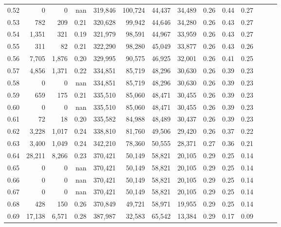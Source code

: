 \begin{tabular}{rrrrrrrrrrrrrr}
0.52 &       0 &      0 &   nan &  319,846 &  100,724 &  44,437 &  34,489 &  0.26 &  0.44 &      0.27 \\
0.53 &     782 &    209 &  0.21 &  320,628 &   99,942 &  44,646 &  34,280 &  0.26 &  0.43 &      0.27 \\
0.54 &   1,351 &    321 &  0.19 &  321,979 &   98,591 &  44,967 &  33,959 &  0.26 &  0.43 &      0.27 \\
0.55 &     311 &     82 &  0.21 &  322,290 &   98,280 &  45,049 &  33,877 &  0.26 &  0.43 &      0.26 \\
0.56 &   7,705 &  1,876 &  0.20 &  329,995 &   90,575 &  46,925 &  32,001 &  0.26 &  0.41 &      0.25 \\
0.57 &   4,856 &  1,371 &  0.22 &  334,851 &   85,719 &  48,296 &  30,630 &  0.26 &  0.39 &      0.23 \\
0.58 &       0 &      0 &   nan &  334,851 &   85,719 &  48,296 &  30,630 &  0.26 &  0.39 &      0.23 \\
0.59 &     659 &    175 &  0.21 &  335,510 &   85,060 &  48,471 &  30,455 &  0.26 &  0.39 &      0.23 \\
0.60 &       0 &      0 &   nan &  335,510 &   85,060 &  48,471 &  30,455 &  0.26 &  0.39 &      0.23 \\
0.61 &      72 &     18 &  0.20 &  335,582 &   84,988 &  48,489 &  30,437 &  0.26 &  0.39 &      0.23 \\
0.62 &   3,228 &  1,017 &  0.24 &  338,810 &   81,760 &  49,506 &  29,420 &  0.26 &  0.37 &      0.22 \\
0.63 &   3,400 &  1,049 &  0.24 &  342,210 &   78,360 &  50,555 &  28,371 &  0.27 &  0.36 &      0.21 \\
0.64 &  28,211 &  8,266 &  0.23 &  370,421 &   50,149 &  58,821 &  20,105 &  0.29 &  0.25 &      0.14 \\
0.65 &       0 &      0 &   nan &  370,421 &   50,149 &  58,821 &  20,105 &  0.29 &  0.25 &      0.14 \\
0.66 &       0 &      0 &   nan &  370,421 &   50,149 &  58,821 &  20,105 &  0.29 &  0.25 &      0.14 \\
0.67 &       0 &      0 &   nan &  370,421 &   50,149 &  58,821 &  20,105 &  0.29 &  0.25 &      0.14 \\
0.68 &     428 &    150 &  0.26 &  370,849 &   49,721 &  58,971 &  19,955 &  0.29 &  0.25 &      0.14 \\
0.69 &  17,138 &  6,571 &  0.28 &  387,987 &   32,583 &  65,542 &  13,384 &  0.29 &  0.17 &      0.09 \\

\end{tabular}
